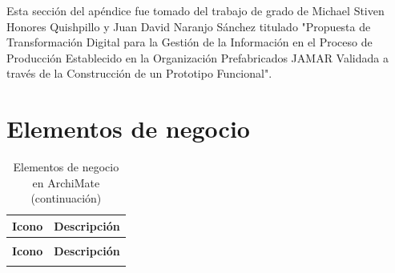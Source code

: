\noindent
Esta sección del apéndice fue tomado del trabajo de grado de Michael Stiven Honores Quishpillo y Juan David Naranjo Sánchez titulado "Propuesta de Transformación Digital para la Gestión de la Información en el Proceso de Producción Establecido en la Organización Prefabricados JAMAR Validada a través de la Construcción de un Prototipo Funcional". 

\section{Elementos de negocio}

\begin{longtable}{|c|p{8cm}|}
\caption{Elementos de negocio en ArchiMate} \label{tab:elementos-negocio-archimate} \\
\hline
\textbf{Icono} & \textbf{Descripción} \\
\hline
\endfirsthead

\caption[]{Elementos de negocio en ArchiMate (continuación)} \\
\hline
\textbf{Icono} & \textbf{Descripción} \\
\hline
\endhead

\hline
\endfoot


\end{longtable}
